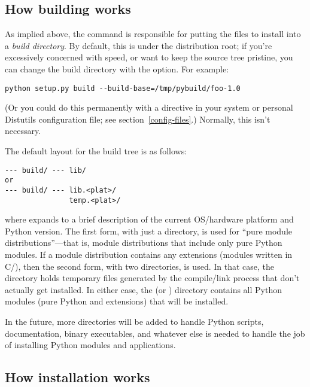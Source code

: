 \documentclass{howto}
\begin{document}
\subsection{How building works}
\label{how-build-works}

As implied above, the  command is responsible for putting
the files to install into a \emph{build directory}.  By default, this is
 under the distribution root; if you're excessively
concerned with speed, or want to keep the source tree pristine, you can
change the build directory with the  option.
For example:

\begin{verbatim}
python setup.py build --build-base=/tmp/pybuild/foo-1.0
\end{verbatim}

(Or you could do this permanently with a directive in your system or
personal Distutils configuration file; see
section~\ref{config-files}.)  Normally, this isn't necessary.

The default layout for the build tree is as follows:

\begin{verbatim}
--- build/ --- lib/
or
--- build/ --- lib.<plat>/
               temp.<plat>/
\end{verbatim}

where  expands to a brief description of the current
OS/hardware platform and Python version.  The first form, with just a
 directory, is used for ``pure module distributions''---that
is, module distributions that include only pure Python modules.  If a
module distribution contains any extensions (modules written in C/\Cpp),
then the second form, with two  directories, is used.  In
that case, the  directory holds temporary
files generated by the compile/link process that don't actually get
installed.  In either case, the  (or
) directory contains all Python modules (pure
Python and extensions) that will be installed.

In the future, more directories will be added to handle Python scripts,
documentation, binary executables, and whatever else is needed to handle
the job of installing Python modules and applications.


\subsection{How installation works}
\label{how-install-works}
\end{document}
